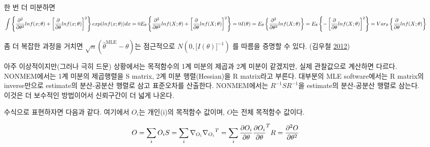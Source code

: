 \documentclass[
  10pt,
  krantz2,
  a4paper]{krantz}
\theoremstyle{definition}
\theoremstyle{definition}
\theoremstyle{definition}
\theoremstyle{remark}
\begin{document}
한 번 더 미분하면
\begin{equation}
\int\left\{ \frac{\partial^{2}}{\partial\theta^{2}}lnf(x;\theta) + \left\lbrack \frac{\partial}{\partial\theta}lnf(x;\theta) \right\rbrack^{2} \right\} exp(lnf(x;\theta))dx = 0 \\

E_{\theta}\left\{ \frac{\partial^{2}}{\partial\theta^{2}}lnf(X;\theta) + \left\lbrack \frac{\partial}{\partial\theta}lnf(X;\theta) \right\rbrack^{2} \right\} = 0 \\

I(\theta) = E_{\theta}\left\{ \frac{\partial^{2}}{\partial\theta^{2}}lnf(X;\theta) \right\} = E_{\theta}\left\{ - \left\lbrack \frac{\partial}{\partial\theta}lnf(X;\theta) \right\rbrack^{2} \right\} = Var_{\theta}\left\{ \frac{\partial}{\partial\theta}lnf(X;\theta) \right\} 
\label{eq:diff-diff}
\end{equation}

좀 더 복잡한 과정을 거치면 \(\sqrt{n}({\widehat{\theta}}^{\text{MLE}} - \theta)\)는 점근적으로 \(N(0,\lbrack I(\theta)\rbrack^{- 1})\) 를 따름을 증명할 수 있다. (김우철 \protect\hyperlink{ref-kim}{2012})

아주 이상적이지만(그러나 극히 드문) 상황에서는 목적함수의 1계 미분의 제곱과 2계 미분이 같겠지만, 실제 관찰값으로 계산하면
다르다. NONMEM에서는 1계 미분의 제곱행렬을 S matrix, 2계 미분 행렬(Hessian)을 R matrix라고
부른다. 대부분의 MLE software에서는 R matrix의 inverse만으로 estimate의 분산-공분산 행렬로 삼고
표준오차를 산출한다. NONMEM에서는 \(R^{- 1}SR^{- 1}\)을 estimate의 분산-공분산 행렬로 삼는다. 이것은
더 보수적인 방법이어서 신뢰구간이 더 넓게 나온다.

수식으로 표현하자면 다음과 같다. 여기에서 \(O_{i}\)는 개인(i)의 목적함수 값이며, \(O\)는 전체 목적함수 값이다.

\begin{equation}
O = \sum_{i}^{}O_{i} \\
S = \sum_{i}^{}{\nabla_{O_{i}}{\nabla_{O_{i}}}^{T}} = \sum_{i}^{}\frac{\partial O_{i}}{\partial\theta}\frac{\partial O_{i}}{\partial\theta}^{T} \\
R = \frac{\partial^{2}O}{\partial\theta^{2}}
\label{eq:o-s-r}
\end{equation}
\end{document}
